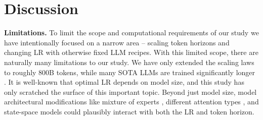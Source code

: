 
\section{Discussion}




\textbf{Limitations.} To limit the scope and computational requirements of our study we have intentionally focused on a narrow area -- scaling token horizons and changing LR with otherwise fixed LLM recipes. With this limited scope, there are naturally many limitations to our study. We have only extended the scaling laws to roughly 800B tokens, while many SOTA LLMs are trained significantly longer \citep{llama3}. It is well-known that optimal LR depends on model size, and this study has only scratched the surface of this important topic. Beyond just model size, model architectural modifications like mixture of experts \citep{moe2017},  different attention types \citep{2023gqa}, and state-space models \citep{gu2023mamba} could plausibly interact with both the LR and token horizon. 





 





